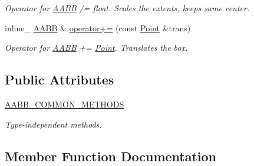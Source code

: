 \begin{DoxyCompactItemize}
\begin{DoxyCompactList}\small\item\em Operator for \hyperlink{classOpcode_1_1AABB}{A\+A\+BB} /= float. Scales the extents, keeps same center. \end{DoxyCompactList}\item 
inline\+\_\+ \hyperlink{classOpcode_1_1AABB}{A\+A\+BB} \& \hyperlink{classOpcode_1_1AABB_a27a554b6965cbe64f2890c3794de6844}{operator+=} (const \hyperlink{classOpcode_1_1Point}{Point} \&trans)\hypertarget{classOpcode_1_1AABB_a27a554b6965cbe64f2890c3794de6844}{}\label{classOpcode_1_1AABB_a27a554b6965cbe64f2890c3794de6844}

\begin{DoxyCompactList}\small\item\em Operator for \hyperlink{classOpcode_1_1AABB}{A\+A\+BB} += \hyperlink{classOpcode_1_1Point}{Point}. Translates the box. \end{DoxyCompactList}\end{DoxyCompactItemize}
\subsection*{Public Attributes}
\begin{DoxyCompactItemize}
\item 
\hyperlink{classOpcode_1_1AABB_a8c3c9c6f10e834586252520ef9fe37a0}{A\+A\+B\+B\+\_\+\+C\+O\+M\+M\+O\+N\+\_\+\+M\+E\+T\+H\+O\+DS}\hypertarget{classOpcode_1_1AABB_a8c3c9c6f10e834586252520ef9fe37a0}{}\label{classOpcode_1_1AABB_a8c3c9c6f10e834586252520ef9fe37a0}

\begin{DoxyCompactList}\small\item\em Type-\/independent methods. \end{DoxyCompactList}\end{DoxyCompactItemize}


\subsection{Member Function Documentation}
